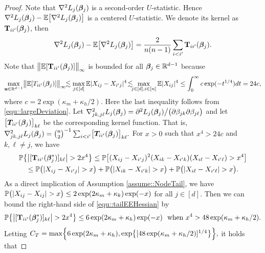 \documentclass[twoside,11pt]{article}
\newcommand*{\BR}{\mathbb{R}}
\newcommand*{\hessss}{\nabla^2  {L_j}(\bbeta_{j})}
\begin{document}
\begin{proof} 
Note that $\hessss$ is a second-order $U$-statistic.  Hence $\hessss - \EE \bigl[\hessss\bigr]$ is a centered $U$-statistic. We denote its kernel as $\mathbf{T}_{ii'}(\bm{\beta}_j)$, then $$\hessss- \EE \bigl[\hessss \bigr]= \frac{2}{n(n-1)} \sum_{i<i'} \Tb_{ii'}(\bbeta_j).$$  Note that $ \bigl \| \mathbb{E} [\mathbf{T}_{ii'}(\bm{\beta}_j) ]\bigr \|_\infty $ is  bounded for all $\bbeta_j\in \BR^{d-1}$ because  
$$\max_{\ub\in\BR^{d-1}}\bigl \| \EE [ T_{ii'}(\bbeta_j) ]\bigr \|_\infty\!\!\lesssim \max_{j\in [d]} \EE | X_{ij} -X_{i'j} | ^4\!\lesssim\!\!\! \max_{j\in[d],i\in[n]}\EE |X_{ij}|^4 \leq \int_0^\infty c \exp( -t^{1/4}) dt = 24 c,$$  
where  $c = 2\exp(\kappa_m+\kappa_h/2).$
Here the last inequality follows from \eqref{equ::largeDeviation}.
Let $ \nabla^2_{jk,j\ell} L_j(\bm{\beta}_j) = \partial^2 L_j(\bm{\beta}_j)\big /\bigl(\partial \beta_{jk}\partial \beta_{j\ell}\bigr)$ and let $\bigl[\bm{T}_{ii'}(\bm{\beta}_j) \bigr]_{k\ell}$ be the corresponding kernel function. That is, $\nabla^2_{jk,j\ell} L_j(\bm{\beta}_j) = {n \choose 2}^{-1} \sum_{i<i'}\bigl[\bm{T}_{ii'}(\bm{\beta}_j) \bigr]_{k\ell}.$  For $x >0$   such that $ x^4 >24 c  $ and $k, \ell \neq j$,  we have 
\begin{align}\label{equ::tailEEHessian}
&\PP\bigl\{\bigl |[\Tb_{ii'}(\bbeta_j^*)]_{k \ell}\bigr |>2 x^4\bigr\} \leq \PP\bigl[   (X_{ij} -X_{i'j} ) ^2 (X_{ik } -X_{i'k} )( X_{i\ell}- X_{i'\ell})>  x^4\bigr]\notag\\
& \quad  \leq \PP\bigl(  |X_{ij} -X_{i'j} | >  x\bigr) +  \PP\bigl(   |X_{ik} -X_{i'k} | >  x\bigr) +  \PP\bigl(   |X_{i\ell} -X_{i'\ell} | >  x\bigr). 
\end{align}
As a direct implication of Assumption \ref{assume::NodeTail}, we have 
 $\mathbb{P}\bigl( |X_{ij} - X_{ij}| > x\bigr ) \leq 2 \exp(2\kappa_m +  \kappa _k)\exp(-x)$  for all $j \in [d].$ Then  we can bound the right-hand side of \eqref{equ::tailEEHessian} by 
\begin{align*}
\PP\bigl\{\bigl |[\Tb_{ii'}(\bbeta_j^*)]_{k \ell}\bigr |>2 x^4\bigr\}  \leq 6\exp(2\kappa_m +  \kappa _h) \exp(-x)~~\text{when} ~x^ 4 > 48\exp(\kappa_m+\kappa_h/2).
\end{align*}
Letting $C_{T}= \max\Bigl \{ 6\exp(2\kappa_m +  \kappa _h), \exp\bigl\{[48\exp(\kappa_m+\kappa_h/2)]^{1/4}\bigr\}\Bigr \},$ it holds that  

\end{proof}
\end{document}
